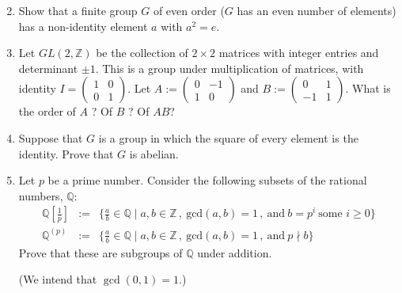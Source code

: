 \documentclass[12pt]{article}
\newcommand{\QQ}{{\mathbb Q}}
\newcommand{\ZZ}{{\mathbb Z}}
\newcommand{\vect}[2]{(\begin{smallmatrix}#1\\#2\end{smallmatrix})}
\begin{document}
\begin{enumerate}
\setcounter{enumi}{1}

\item 
     Show that a finite group $G$ of even order ($G$ has an even number of elements) has a non-identity element $a$ with $a^2=e$.
  
\item Let $GL(2,\ZZ)$ be the collection of $2\times 2$ matrices with integer entries and determinant $\pm 1$.
      This is a group under multiplication of matrices, with identity $I=\vect{1&0}{0&1}$.
      Let $A:=\vect{0&-1}{1&0}$ and  $B:=\vect{0&1}{-1&1}$.
      What is the order of $A$ ?  Of $B$ ? Of $AB$?

\item Suppose that $G$ is a group in which the square of every element is the identity.
      Prove that $G$ is abelian.

\item
  Let $p$ be a prime number.
  Consider the following subsets of the rational numbers, $\QQ$:
%
  \begin{eqnarray*}
    \QQ[\tfrac{1}{p}] &:=& \{ \tfrac{a}{b}\in\QQ \mid
        a,b\in\ZZ\,,\ \mbox{gcd}(a,b)=1\,,\ \mbox{and}\ b=p^i\ \mbox{some } i\geq0\}\\
    \QQ^{(p)} &:=& \{ \tfrac{a}{b}\in\QQ \mid
       a,b\in\ZZ\,,\ \mbox{gcd}(a,b)=1\,,\ \mbox{and}\ p\nmid b\}
  \end{eqnarray*}
%
  Prove that these are subgroups of $\QQ$ under addition.

  (We intend that $\gcd(0,1)=1$.)
  
    
      
\end{enumerate}
\end{document}
